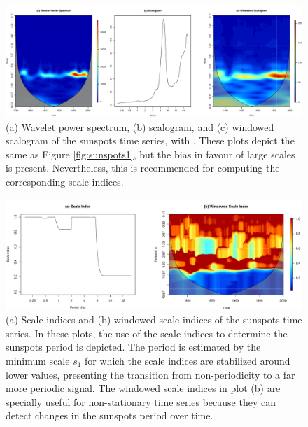 \begin{figure}[tbp]
\begin{center}
  \includegraphics[width=\textwidth]{Figure16}
\end{center}
\caption{(a) Wavelet power spectrum, (b) scalogram, and (c) windowed scalogram of the sunspots time series, with . These plots depict the same as Figure \ref{fig:sunspots1}, but the bias in favour of large scales is present. Nevertheless, this is recommended for computing the corresponding scale indices.}
\label{fig:sunspots2}
\end{figure}

\begin{figure}[tbp]
\begin{center}
  \includegraphics[width=\textwidth]{Figure17}
\end{center}
\caption{(a) Scale indices and (b) windowed scale indices of the sunspots time series. In these plots, the use of the scale indices to determine the sunspots period is depicted. The period is estimated by the minimum scale $s_1$ for which the scale indices are stabilized around lower values, presenting the transition from non-periodicity to a far more periodic signal. The windowed scale indices in plot (b) are specially useful for non-stationary time series because they can detect changes in the sunspots period over time.}
\label{fig:sunspots3}
\end{figure}




